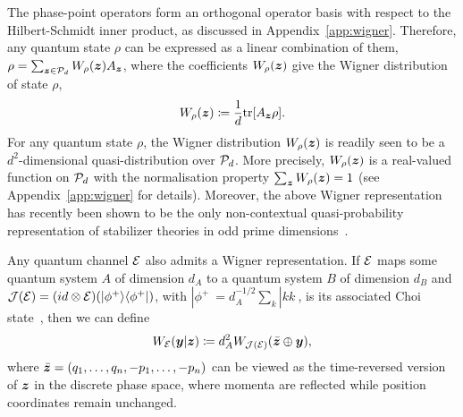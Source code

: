 \documentclass[pra,
aps,
twocolumn,
superscriptaddress,
groupedaddress,
nofootinbib,
reprint
]{revtex4-1}
\begin{document}
The phase-point operators form an orthogonal operator basis with respect to the Hilbert-Schmidt inner product, as discussed in Appendix~\ref{app:wigner}.
Therefore, any quantum state $\rho$ can be expressed as a linear combination of them, $\rho = \sum_{\bmz \in \cal{P}_d} \W[\bmz]{\rho} A_{\bmz}$, where the coefficients $\W{\rho}(\z)$ give the Wigner distribution of state $\rho$,
\begin{equation}\label{eq:wstate}
    \W[\bmz]{\rho} \coloneqq \frac{1}{d}\tr[A_{\bmz} \rho].
\end{equation}
For any quantum state $\rho$, the Wigner distribution $W_\rho(\bmz)$ is readily seen to be a $d^2$-dimensional quasi-distribution over $\cal{P}_d$. More precisely, $W_\rho(\bmz)$ is a real-valued function on $\P_d$ with the normalisation property $\sum_{\bmz} W_\rho(\bmz) = 1$ (see Appendix~\ref{app:wigner} for details). Moreover, the above Wigner representation has recently been shown to be the only non-contextual quasi-probability representation of stabilizer theories in odd prime dimensions~\cite{schmid2021noncontextual}.

Any quantum channel $\E$ also admits a Wigner representation. If $\E$ maps some quantum system $A$ of dimension $d_A$ to a quantum system $B$ of dimension $d_B$ and $\J(\E) = (id \otimes \E) (|\phi^+\> \<\phi^+|)$, with $|\phi^+\> = d_A^{-1/2} \sum_k |kk\>$, is its associated Choi state~\cite{watrous_2018}, then we can define
\begin{equation}\label{Wigner-Choi}
W_{\E}(\y |\bmz) \coloneqq d_A^2 W_{\J(\E)}(\bar{\bmz} \oplus \y),
\end{equation}
where $\bar{\bmz} = (q_1, \dots, q_n, -p_1, \dots, -p_n)$ can be viewed as the time-reversed version of $\bmz$ in the discrete phase space, where momenta are reflected while position coordinates remain unchanged. 
\end{document}
